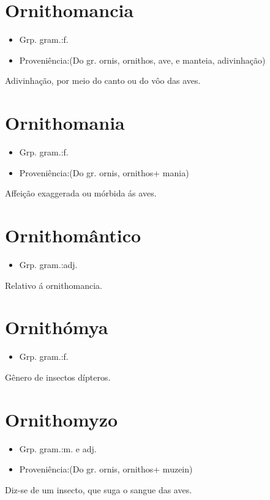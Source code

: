 \section{Ornithomancia}
\begin{itemize}
\item {Grp. gram.:f.}
\end{itemize}
\begin{itemize}
\item {Proveniência:(Do gr. \textunderscore ornis\textunderscore , \textunderscore ornithos\textunderscore , ave, e \textunderscore manteia\textunderscore , adivinhação)}
\end{itemize}
Adivinhação, por meio do canto ou do vôo das aves.
\section{Ornithomania}
\begin{itemize}
\item {Grp. gram.:f.}
\end{itemize}
\begin{itemize}
\item {Proveniência:(Do gr. \textunderscore ornis\textunderscore , \textunderscore ornithos\textunderscore  + \textunderscore mania\textunderscore )}
\end{itemize}
Affeição exaggerada ou mórbida ás aves.
\section{Ornithomântico}
\begin{itemize}
\item {Grp. gram.:adj.}
\end{itemize}
Relativo á ornithomancia.
\section{Ornithómya}
\begin{itemize}
\item {Grp. gram.:f.}
\end{itemize}
Gênero de insectos dípteros.
\section{Ornithomyzo}
\begin{itemize}
\item {Grp. gram.:m.  e  adj.}
\end{itemize}
\begin{itemize}
\item {Proveniência:(Do gr. \textunderscore ornis\textunderscore , \textunderscore ornithos\textunderscore  + \textunderscore muzein\textunderscore )}
\end{itemize}
Diz-se de um insecto, que suga o sangue das aves.
